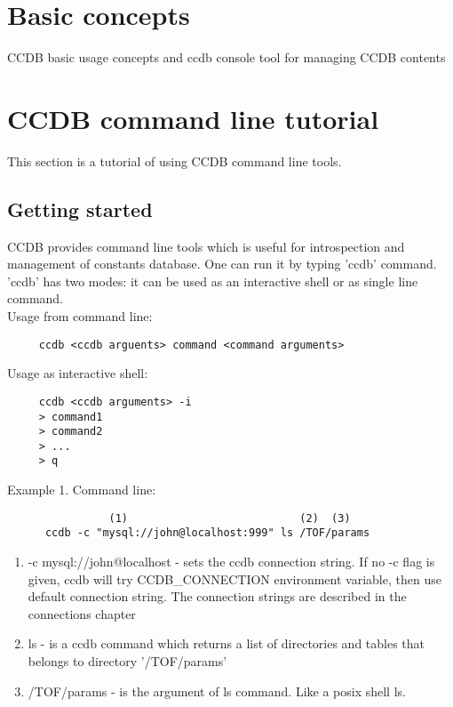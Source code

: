 \documentclass{article}
\begin{document}
\section{Basic concepts}\label{sec:basic_concepts}


CCDB basic usage concepts and ccdb console tool for managing CCDB contents


\section{CCDB command line tutorial}\label{sec:console_tools_tutorial}

This section is a tutorial of using CCDB command line tools.


\subsection {Getting started}

CCDB provides command line tools which is useful for introspection and 
management of constants database. One can run it by typing 'ccdb' command. 
'ccdb' has two modes: it can be used as an interactive shell or as 
single line command.\\


Usage from command line:
\begin{verbatim}
     ccdb <ccdb arguents> command <command arguments>
\end{verbatim}


Usage as interactive shell:
\begin{verbatim}
     ccdb <ccdb arguments> -i
     > command1
     > command2
     > ...
     > q
\end{verbatim}


Example 1. Command line:
\begin{verbatim}
                (1)                           (2)  (3)
      ccdb -c "mysql://john@localhost:999" ls /TOF/params

\end{verbatim}


\begin{enumerate}
  \item -c mysql://john@localhost - sets the ccdb connection string. If no -c flag is given, ccdb will try CCDB\_CONNECTION environment variable, then use default connection string. The connection strings are described in the connections chapter

  \item  ls - is a ccdb command which returns a list of directories and tables
         that belongs to directory '/TOF/params'

  \item  /TOF/params - is the argument of ls command. Like a posix shell ls.
\end{enumerate}
\end{document}
